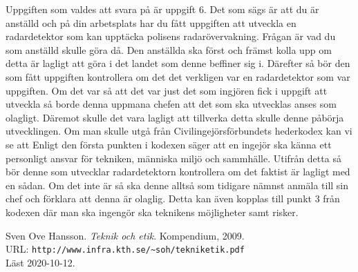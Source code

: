 \documentclass[a4paper,12pt]{article}
\begin{document}
  Uppgiften som valdes att svara på är uppgift 6. Det som sägs är att du är anställd 
  och på din arbetsplats har du fått uppgiften att utveckla en radardetektor som kan 
  upptäcka polisens radarövervakning. Frågan är vad du som anställd skulle göra då.
  Den anställda ska först och främst kolla upp om detta är lagligt att göra i det landet
  som denne beffiner sig i. Därefter så bör den som fått uppgiften kontrollera om det
  det verkligen var en radardetektor som var uppgiften. Om det var så att det var 
  just det som ingjören fick i uppgift att utveckla så borde denna uppmana chefen att
  det som ska utvecklas anses som olagligt. Däremot skulle det vara lagligt att tillverka 
  detta skulle denne påbörja utvecklingen. Om man skulle utgå från Civilingejörsförbundets
  hederkodex kan vi se att Enligt den första punkten i kodexen säger att en ingejör ska
  känna ett personligt ansvar för tekniken, människa miljö och sammhälle. Utifrån detta
  så bör denne som utvecklar radardetektorn kontrollera om det faktist är lagligt med 
  en sådan. Om det inte är så ska denne alltså som tidigare nämnst anmäla till sin chef
  och förklara att denna är olaglig. Detta kan även kopplas till punkt 3 från
  kodexen där man ska ingengör ska teknikens möjligheter samt risker. 
  


\begin{thebibliography}{99}
   Sven Ove Hansson. \emph{Teknik och etik}.
    Kompendium, 2009. \\
    URL: \verb|http://www.infra.kth.se/~soh/tekniketik.pdf| \\
    Läst 2020-10-12. 
  \end{thebibliography}
\end{document}
